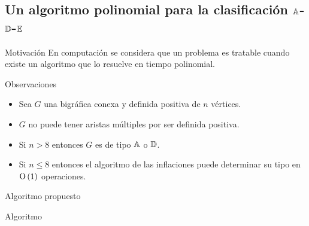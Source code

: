 \documentclass[spanish]{beamer}
\begin{document}
\subsection{Un algoritmo polinomial para la clasificación 
$\protect\mathbb{A}$-$\protect\mathbb{D}$-$\protect\mathbb{E}$}

\begin{frame}{Motivación}
  En computación se considera que un problema es tratable cuando existe un 
  algoritmo que lo resuelve en tiempo polinomial.
\end{frame}

\begin{frame}{Observaciones}
  \begin{itemize}[<+->]
    \item Sea $G$ una bigráfica conexa y definida positiva de $n$ vértices.
    \item $G$ no puede tener aristas múltiples por ser definida positiva.
    \item Si $n > 8$ entonces $G$ es de tipo $\mathbb{A}$ o $\mathbb{D}$.
    \item Si $n \le 8$ entonces el algoritmo de las inflaciones puede 
    determinar su tipo en $\operatorname{O}\left( 1 \right)$ operaciones.
  \end{itemize}
\end{frame}

\begin{frame}{Algoritmo propuesto}
  \begin{block}{Algoritmo}
    \begin{algorithm}[H]
    \end{algorithm}
  \end{block}
\end{frame}
\end{document}
